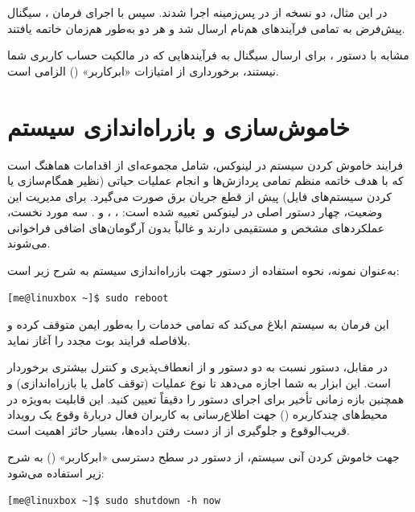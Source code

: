 در این مثال، دو نسخه از  در پس‌زمینه اجرا شدند. سپس با اجرای فرمان ، سیگنال پیش‌فرض  به تمامی فرآیندهای هم‌نام ارسال شد و هر دو به‌طور هم‌زمان خاتمه یافتند.

مشابه با دستور ، برای ارسال سیگنال به فرآیندهایی که در مالکیت حساب کاربری شما نیستند، برخورداری از امتیازات «ابرکاربر» () الزامی است.

\section{خاموش‌سازی و بازراه‌اندازی سیستم}

فرایند خاموش کردن سیستم در لینوکس، شامل مجموعه‌ای از اقدامات هماهنگ است که با هدف خاتمه منظم تمامی پردازش‌ها و انجام عملیات حیاتی (نظیر همگام‌سازی یا  کردن سیستم‌های فایل) پیش از قطع جریان برق صورت می‌گیرد. برای مدیریت این وضعیت، چهار دستور اصلی در لینوکس تعبیه شده است: ، ،  و . سه مورد نخست، عملکردهای مشخص و مستقیمی دارند و غالباً بدون آرگومان‌های اضافی فراخوانی می‌شوند.

به‌عنوان نمونه، نحوه استفاده از دستور  جهت بازراه‌اندازی سیستم به شرح زیر است:

\begin{latin}
\begin{lstlisting}
[me@linuxbox ~]$ sudo reboot
\end{lstlisting}
\end{latin}

این فرمان به سیستم ابلاغ می‌کند که تمامی خدمات را به‌طور ایمن متوقف کرده و بلافاصله فرایند بوت مجدد را آغاز نماید.

در مقابل، دستور  نسبت به دو دستور  و  از انعطاف‌پذیری و کنترل بیشتری برخوردار است. این ابزار به شما اجازه می‌دهد تا نوع عملیات (توقف کامل یا بازراه‌اندازی) و همچنین بازه زمانی تأخیر برای اجرای دستور را دقیقاً تعیین کنید. این قابلیت به‌ویژه در محیط‌های چندکاربره () جهت اطلاع‌رسانی به کاربران فعال دربارهٔ وقوع یک رویداد قریب‌الوقوع و جلوگیری از از دست رفتن داده‌ها، بسیار حائز اهمیت است.

جهت خاموش کردن آنی سیستم، از دستور  در سطح دسترسی «ابرکاربر» () به شرح زیر استفاده می‌شود:

\begin{latin}
\begin{lstlisting}
[me@linuxbox ~]$ sudo shutdown -h now
\end{lstlisting}
\end{latin}

